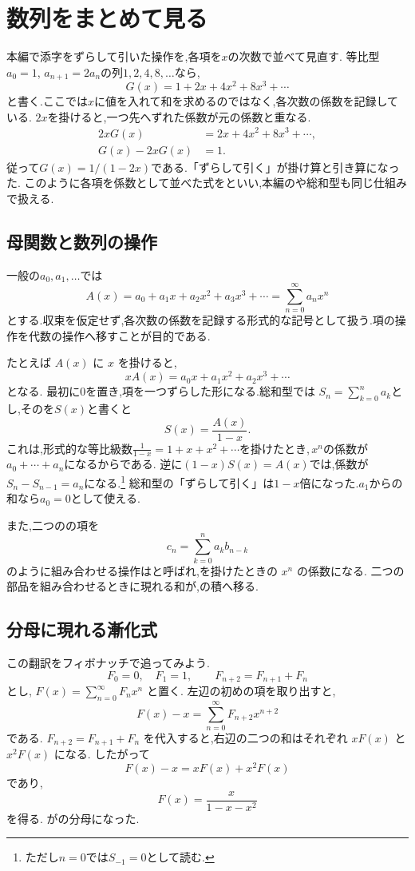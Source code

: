 
\section{数列をまとめて見る}\label{節：数列全体を一つの対象にまとめると,何が見えるか}

本編で添字をずらして引いた操作を,各項を$x$の次数で並べて見直す.
等比型$a_0=1$, $a_{n+1}=2a_n$の列$1,2,4,8,\ldots$なら,
\[
  G(x)=1+2x+4x^2+8x^3+\cdots
\]
と書く.ここでは$x$に値を入れて和を求めるのではなく,各次数の係数を記録している.
$2x$を掛けると,一つ先へずれた係数が元の係数と重なる.
\[
  \begin{aligned}
    2xG(x)&=2x+4x^2+8x^3+\cdots,\\
    G(x)-2xG(x)&=1.
  \end{aligned}
\]
従って$G(x)=1/(1-2x)$である.「ずらして引く」が掛け算と引き算になった.
このように各項を係数として並べた式をといい,本編のや総和型も同じ仕組みで扱える.

\subsection{母関数と数列の操作}
一般の$a_0,a_1,\ldots$では
\[
  A(x)=a_0+a_1x+a_2x^2+a_3x^3+\cdots
  =\sum_{n=0}^{\infty}a_nx^n
\]
とする.収束を仮定せず,各次数の係数を記録する形式的な記号として扱う.項の操作を代数の操作へ移すことが目的である.

たとえば $A(x)$ に $x$ を掛けると,
\[
  xA(x)=a_0x+a_1x^2+a_2x^3+\cdots
\]
となる.
最初に$0$を置き,項を一つずらした形になる.総和型では
$S_n=\sum_{k=0}^n a_k$とし,そのを$S(x)$と書くと
\[
  S(x)=\frac{A(x)}{1-x}.
\]
これは,形式的な等比級数$\displaystyle \frac{1}{1-x}=1+x+x^2+\cdots$を掛けたとき,\,$x^n$の係数が$a_0+\cdots+a_n$になるからである.
逆に$(1-x)S(x)=A(x)$では,係数が$S_n-S_{n-1}=a_n$になる.\footnote{ただし$n=0$では$S_{-1}=0$として読む.}
総和型の「ずらして引く」は$1-x$倍になった.$a_1$からの和なら$a_0=0$として使える.

また,二つのの項を
\[
  c_n=\sum_{k=0}^{n}a_kb_{n-k}
\]
のように組み合わせる操作はと呼ばれ,を掛けたときの $x^n$ の係数になる.
二つの部品を組み合わせるときに現れる和が,の積へ移る.

\subsection{分母に現れる漸化式}
この翻訳をフィボナッチで追ってみよう.
\[
  F_0=0,\quad F_1=1,\qquad F_{n+2}=F_{n+1}+F_n
\]
とし,\,\,$F(x)=\sum_{n=0}^{\infty}F_nx^n$ と置く.
左辺の初めの項を取り出すと,
\[
  F(x)-x=\sum_{n=0}^{\infty}F_{n+2}x^{n+2}
\]
である.
 $F_{n+2}=F_{n+1}+F_n$ を代入すると,右辺の二つの和はそれぞれ $xF(x)$ と $x^2F(x)$ になる.
したがって
\[
  F(x)-x=xF(x)+x^2F(x)
\]
であり,
\[
  F(x)=\frac{x}{1-x-x^2}
\]
を得る.
がの分母になった.

